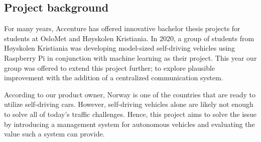\subsection{Project background}
For many years, Accenture has offered innovative bachelor thesis projects for students at OsloMet and Høyskolen Kristiania. In 2020, a group of students from Høyskolen Kristiania was developing model-sized self-driving vehicles using Raspberry Pi in conjunction with machine learning as their project. This year our group was offered to extend this project further; to explore plausible improvement with the addition of a centralized communication system.

According to our product owner, Norway is one of the countries that are ready to utilize self-driving cars. However, self-driving vehicles alone are likely not enough to solve all of today's traffic challenges. Hence, this project aims to solve the issue by introducing a management system for autonomous vehicles and evaluating the value such a system can provide.